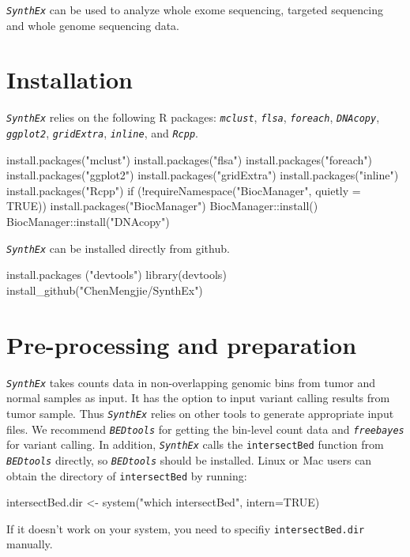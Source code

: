 \documentclass{article}
\newcommand{\pkg}[1]{\texttt{\textsl{#1}}}
\newcommand{\code}[1]{\texttt{#1}}
\begin{document}
\pkg{SynthEx} can be used to analyze whole exome sequencing, targeted sequencing and whole genome sequencing data.

\section{Installation}
\pkg{SynthEx} relies on the following R packages: \pkg{mclust}, \pkg{flsa}, \pkg{foreach}, \pkg{DNAcopy}, \pkg{ggplot2}, \pkg{gridExtra}, \pkg{inline}, and \pkg{Rcpp}.

\begin{Schunk}
\begin{Sinput}
 install.packages("mclust")
 install.packages("flsa")
 install.packages("foreach")
 install.packages("ggplot2")
 install.packages("gridExtra")
 install.packages("inline")
 install.packages("Rcpp")
 if (!requireNamespace("BiocManager", quietly = TRUE))
     install.packages("BiocManager")
 BiocManager::install()
 BiocManager::install("DNAcopy")
\end{Sinput}
\end{Schunk}

\pkg{SynthEx} can be installed directly from github.
\begin{Schunk}
\begin{Sinput}
 install.packages ("devtools")
 library(devtools)
 install_github("ChenMengjie/SynthEx")
\end{Sinput}
\end{Schunk}


\section{Pre-processing and preparation}

\pkg{SynthEx} takes counts data in non-overlapping genomic bins from tumor and normal samples as input. It has the option to input variant calling results from tumor sample. Thus \pkg{SynthEx} relies on other tools to generate appropriate input files. We recommend \pkg{BEDtools} for getting the bin-level count data and \pkg{freebayes} for variant calling. In addition, \pkg{SynthEx} calls the \code{intersectBed} function from \pkg{BEDtools} directly, so \pkg{BEDtools} should be installed.
Linux or Mac users can obtain the directory of \code{intersectBed} by running:
\begin{Schunk}
\begin{Sinput}
 intersectBed.dir <- system("which intersectBed", intern=TRUE)
\end{Sinput}
\end{Schunk}
If it doesn't work on your system, you need to specifiy \code{intersectBed.dir} manually.
\end{document}
